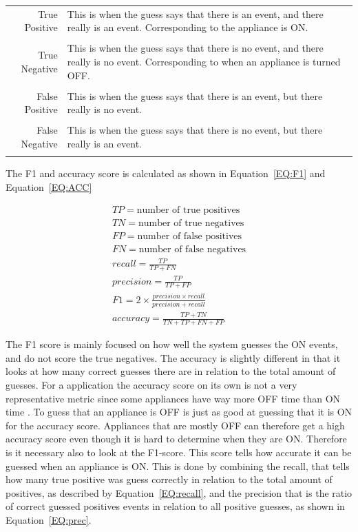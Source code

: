 \begin{tabularx}{\linewidth}{ r X }
True Positive& This is when the guess says that there is an event, and there really is an event. Corresponding to the appliance is ON. \\
\\
True Negative&This is when the guess says that there is no event, and there really is no event. Corresponding to when an appliance is turned OFF. \\
\\
False Positive& This is when the guess says that there is an event, but there really is no event. \\
\\
False Negative&This is when the guess says that there is no event, but there really is an event. \\\\
\end{tabularx}
The F1 and accuracy score is calculated as shown in Equation~\ref{EQ:F1} and Equation~\ref{EQ:ACC}

\begin{gather}
		TP = \text{number of true positives} \\
		TN = \text{number of true negatives} \\
		FP = \text{number of false positives} \\
		FN = \text{number of false negatives} \\
		recall = \frac{TP}{TP+FN} \label{EQ:recall}\\
		precision = \frac{TP}{TP+FP} \label{EQ:prec} \\
		F1 = 2 \times \frac{precision \times recall}{precision + recall} \label{EQ:F1}\\
		accuracy = \frac{TP+TN}{TN+TP+FN+FP} \label{EQ:ACC}
\end{gather}

The F1 score is mainly focused on how well the system guesses the ON events, and do not score the true negatives. The accuracy is slightly different in that it looks at how many correct guesses there are in relation to the total amount of guesses. For a  application the accuracy score on its own is not a very representative metric since some appliances have way more OFF time than ON time \citep{RefWorks:35}. To guess that an appliance is OFF is just as good at guessing that it is ON for the accuracy score. Appliances that are mostly OFF can therefore get a high accuracy score even though it is hard to determine when they are ON. Therefore is it necessary also to look at the F1-score. This score tells how accurate it can be guessed when an appliance is ON. This is done by combining the recall, that tells how many true positive was guess correctly in relation to the total amount of positives, as described by Equation~\ref{EQ:recall}, and the precision that is the ratio of correct guessed positives events in relation to all positive guesses, as shown in Equation~\ref{EQ:prec}. 

